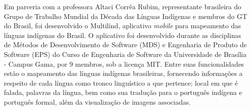 Em parceria com a professora Altaci Corrêa Rubim, representante brasileira do Grupo de Trabalho Mundial da Década das Línguas Indígenas e membros do GT do Brasil, foi
desenvolvido o Multilind, aplicativo \textit{mobile} para mapeamento das línguas indígenas do Brasil. O aplicativo foi desenvolvido durante as disciplinas de Métodos de
Desenvolvimento de Software (MDS) e Engenharia de Produto de Software (EPS) do Curso de Engenharia de Software da Universidade de Brasília - Campus Gama, por 9 membros,
sob a licença MIT. Entre suas funcionalidades estão o mapeamento das línguas indígenas brasileiras, fornecendo informações a respeito de cada língua como tronco
linguístico a que pertence; local em que é falada, palavras da língua, bem como sua tradução para o português indígena e português formal, além da visualização de imagens
associadas.
